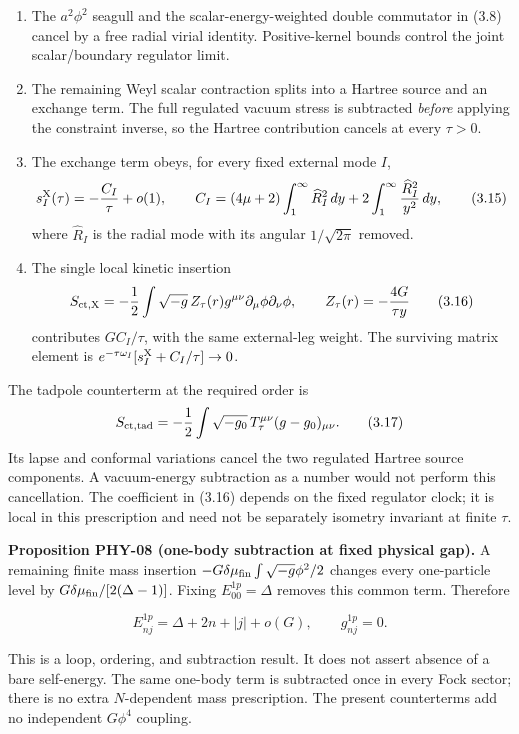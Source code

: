 \documentclass[a4paper,11pt]{article}
\numberwithin{equation}{section}
\providecommand{\tightlist}{\setlength{\itemsep}{0pt}\setlength{\parskip}{0pt}}
\begin{document}
\begin{enumerate}
\def\labelenumi{\arabic{enumi}.}
\tightlist
\item
  The \(a^2\phi^2\) seagull and the scalar-energy-weighted double commutator in (3.8) cancel by a free radial virial identity. Positive-kernel bounds control the joint scalar/boundary regulator limit.
\item
  The remaining Weyl scalar contraction splits into a Hartree source and an exchange term. The full regulated vacuum stress is subtracted \emph{before} applying the constraint inverse, so the Hartree contribution cancels at every \(\tau>0\).
\item
  The exchange term obeys, for every fixed external mode \(I\), \[
  s_I^{\rm X}(\tau)=-\frac{C_I}{\tau}+o(1),\qquad
  C_I=(4\mu+2)\int_1^\infty\widehat R_I^2\,dy
  +2\int_1^\infty\frac{\widehat R_I^2}{y^2}\,dy ,
  \tag{3.15}
  \] where \(\widehat R_I\) is the radial mode with its angular \(1/\sqrt{2\pi}\) removed.
\item
  The single local kinetic insertion \[
  S_{\rm ct,X}=-\frac12\int\sqrt{-g}\,
  Z_\tau(r)g^{\mu\nu}\partial_\mu\phi\partial_\nu\phi,\qquad
  Z_\tau(r)=-\frac{4G}{\tau y}
  \tag{3.16}
  \] contributes \(GC_I/\tau\), with the same external-leg weight. The surviving matrix element is \(e^{-\tau\omega_I}[s_I^{\rm X}+C_I/\tau]\to0\).
\end{enumerate}

The tadpole counterterm at the required order is \[
S_{\rm ct,tad}
=-\frac12\int\sqrt{-g_0}\,T_\tau^{\mu\nu}
(g-g_0)_{\mu\nu}.
\tag{3.17}
\] Its lapse and conformal variations cancel the two regulated Hartree source components. A vacuum-energy subtraction as a number would not perform this cancellation. The coefficient in (3.16) depends on the fixed regulator clock; it is local in this prescription and need not be separately isometry invariant at finite \(\tau\).

\textbf{Proposition PHY-08 (one-body subtraction at fixed physical gap).} A remaining finite mass insertion \(-G\delta\mu_{\rm fin}\int\sqrt{-g}\phi^2/2\) changes every one-particle level by \(G\delta\mu_{\rm fin}/[2(\Delta-1)]\). Fixing \(E_{00}^{1p}=\Delta\) removes this common term. Therefore

\[
\boxed{E_{nj}^{1p}=\Delta+2n+|j|+o(G),\qquad g^{1p}_{nj}=0.}
\tag{3.18}
\]

This is a loop, ordering, and subtraction result. It does not assert absence of a bare self-energy. The same one-body term is subtracted once in every Fock sector; there is no extra \(N\)-dependent mass prescription. The present counterterms add no independent \(G\phi^4\) coupling.
\end{document}
